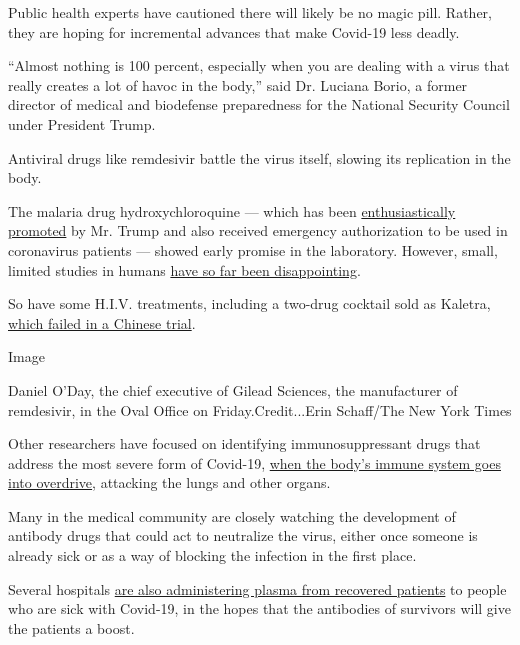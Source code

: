 Public health experts have cautioned there will likely be no magic pill.
Rather, they are hoping for incremental advances that make Covid-19 less
deadly.

``Almost nothing is 100 percent, especially when you are dealing with a
virus that really creates a lot of havoc in the body,'' said Dr. Luciana
Borio, a former director of medical and biodefense preparedness for the
National Security Council under President Trump.

Antiviral drugs like remdesivir battle the virus itself, slowing its
replication in the body.

The malaria drug hydroxychloroquine --- which has been
\href{https://www.nytimes3xbfgragh.onion/2020/04/06/us/politics/coronavirus-trump-malaria-drug.html}{enthusiastically
promoted} by Mr. Trump and also received emergency authorization to be
used in coronavirus patients --- showed early promise in the laboratory.
However, small, limited studies in humans
\href{https://www.nytimes3xbfgragh.onion/2020/04/24/health/fda-hydroxychloroquine-coronavirus.html}{have
so far been disappointing}.

So have some H.I.V. treatments, including a two-drug cocktail sold as
Kaletra,
\href{https://www.nytimes3xbfgragh.onion/2020/03/18/health/coronavirus-antiviral-drugs-fail.html}{which
failed in a Chinese trial}.

Image

Daniel O'Day, the chief executive of Gilead Sciences, the manufacturer
of remdesivir, in the Oval Office on Friday.Credit...Erin Schaff/The New
York Times

Other researchers have focused on identifying immunosuppressant drugs
that address the most severe form of Covid-19,
\href{https://www.nytimes3xbfgragh.onion/2020/04/01/health/coronavirus-cytokine-storm-immune-system.html}{when
the body's immune system goes into overdrive}, attacking the lungs and
other organs.

Many in the medical community are closely watching the development of
antibody drugs that could act to neutralize the virus, either once
someone is already sick or as a way of blocking the infection in the
first place.

Several hospitals
\href{https://slack-redir.net/link?url=https\%3A\%2F\%2Fwww.nytimes3xbfgragh.onion\%2F2020\%2F03\%2F26\%2Fhealth\%2Fplasma-coronavirus-treatment.html}{are
also administering plasma from recovered patients} to people who are
sick with Covid-19, in the hopes that the antibodies of survivors will
give the patients a boost.

